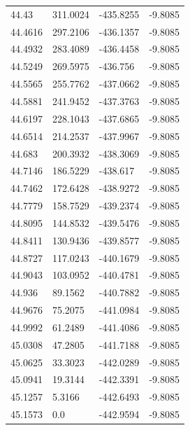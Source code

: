 \begin{table}[H]
\begin{tabular}{llll}
44.43 & 311.0024 & -435.8255 & -9.8085 \\
44.4616 & 297.2106 & -436.1357 & -9.8085 \\
44.4932 & 283.4089 & -436.4458 & -9.8085 \\
44.5249 & 269.5975 & -436.756 & -9.8085 \\
44.5565 & 255.7762 & -437.0662 & -9.8085 \\
44.5881 & 241.9452 & -437.3763 & -9.8085 \\
44.6197 & 228.1043 & -437.6865 & -9.8085 \\
44.6514 & 214.2537 & -437.9967 & -9.8085 \\
44.683 & 200.3932 & -438.3069 & -9.8085 \\
44.7146 & 186.5229 & -438.617 & -9.8085 \\
44.7462 & 172.6428 & -438.9272 & -9.8085 \\
44.7779 & 158.7529 & -439.2374 & -9.8085 \\
44.8095 & 144.8532 & -439.5476 & -9.8085 \\
44.8411 & 130.9436 & -439.8577 & -9.8085 \\
44.8727 & 117.0243 & -440.1679 & -9.8085 \\
44.9043 & 103.0952 & -440.4781 & -9.8085 \\
44.936 & 89.1562 & -440.7882 & -9.8085 \\
44.9676 & 75.2075 & -441.0984 & -9.8085 \\
44.9992 & 61.2489 & -441.4086 & -9.8085 \\
45.0308 & 47.2805 & -441.7188 & -9.8085 \\
45.0625 & 33.3023 & -442.0289 & -9.8085 \\
45.0941 & 19.3144 & -442.3391 & -9.8085 \\
45.1257 & 5.3166 & -442.6493 & -9.8085 \\
45.1573 & 0.0 & -442.9594 & -9.8085 \\
\bottomrule
\end{tabular}

\end{table}
